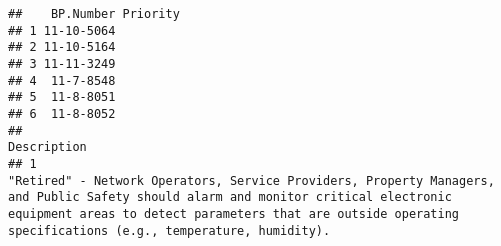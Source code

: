 \documentclass[
]{article}
\begin{document}
\begin{verbatim}
##    BP.Number Priority
## 1 11-10-5064         
## 2 11-10-5164         
## 3 11-11-3249         
## 4  11-7-8548         
## 5  11-8-8051         
## 6  11-8-8052         
##                                                                                                                                                                                                                                                                                                                                                                                                                                                                                                                                                                                                                                                                                                                                                                                                                                                                                                                                                                                                                                                                                                                                                                                                                                                                                                                                                                                                                                                               Description
## 1                                                                                                                                                                                                                                                                                                                                                                                                                                                                                                                                                                                                                                                                                                                                                                                                                                                                                                                                                                                                                                                                                                                                                                                                                       "Retired" - Network Operators, Service Providers, Property Managers, and Public Safety should alarm and monitor critical electronic equipment areas to detect parameters that are outside operating specifications (e.g., temperature, humidity).

\end{verbatim}
\end{document}

